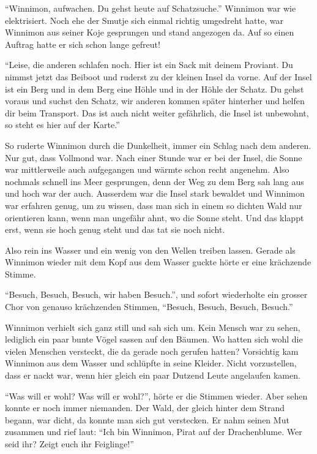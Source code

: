 \enquote{Winnimon, aufwachen. Du gehst heute auf Schatzsuche.} Winnimon war wie elektrisiert. Noch ehe der Smutje sich einmal richtig umgedreht hatte, war Winnimon aus seiner Koje gesprungen und stand angezogen da. Auf so einen Auftrag hatte er sich schon lange gefreut!

\enquote{Leise, die anderen schlafen noch. Hier ist ein Sack mit deinem Proviant. Du nimmst jetzt das Beiboot und ruderst zu der kleinen Insel da vorne. Auf der Insel ist ein Berg und in dem Berg eine Höhle und in der Höhle der Schatz. Du gehst voraus und suchst den Schatz, wir anderen kommen später hinterher und helfen dir beim Transport. Das ist auch nicht weiter gefährlich, die Insel ist unbewohnt, so steht es hier auf der Karte.}

So ruderte Winnimon durch die Dunkelheit, immer ein Schlag nach dem anderen. Nur gut, dass Vollmond war. Nach einer Stunde war er bei der Insel, die Sonne war mittlerweile auch aufgegangen und wärmte schon recht angenehm. Also nochmals schnell ins Meer gesprungen, denn der Weg zu dem Berg sah lang aus und hoch war der auch. Ausserdem war die Insel stark bewaldet und Winnimon war erfahren genug, um zu wissen, dass man sich in einem so dichten Wald nur orientieren kann, wenn man ungefähr ahnt, wo die Sonne steht. Und das klappt erst, wenn sie hoch genug steht und das tat sie noch nicht.

Also rein ins Wasser und ein wenig von den Wellen treiben lassen. Gerade als Winnimon wieder mit dem Kopf aus dem Wasser guckte hörte er eine krächzende Stimme.

\enquote{Besuch, Besuch, Besuch, wir haben Besuch.}, und sofort wiederholte ein grosser Chor von genauso krächzenden Stimmen, \enquote{Besuch, Besuch, Besuch, Besuch.}

Winnimon verhielt sich ganz still und sah sich um. Kein Mensch war zu sehen, lediglich ein paar bunte Vögel sassen auf den Bäumen. Wo hatten sich wohl die vielen Menschen versteckt, die da gerade noch gerufen hatten? Vorsichtig kam Winnimon aus dem Wasser und schlüpfte in seine Kleider. Nicht vorzustellen, dass er nackt war, wenn hier gleich ein paar Dutzend Leute angelaufen kamen.

\enquote{Was will er wohl? Was will er wohl?}, hörte er die Stimmen wieder. Aber sehen konnte er noch immer niemanden. Der Wald, der gleich hinter dem Strand begann, war dicht, da konnte man sich gut verstecken. Er nahm seinen Mut zusammen und rief laut: \enquote{Ich bin Winnimon, Pirat auf der Drachenblume. Wer seid ihr? Zeigt euch ihr Feiglinge!}

